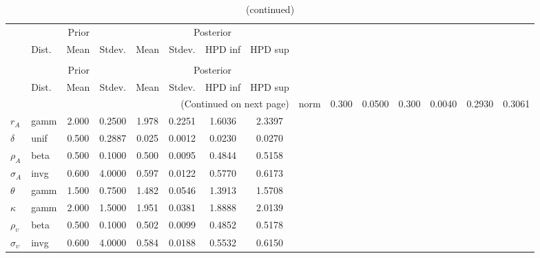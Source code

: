  
\begin{center}
\begin{longtable}{llcccccc} 
\caption{Results from Metropolis-Hastings (parameters)}
 \label{Table:MHPosterior:1}\\
\toprule 
  & \multicolumn{3}{c}{Prior}  &  \multicolumn{4}{c}{Posterior} \\
  \cmidrule(r{.75em}){2-4} \cmidrule(r{.75em}){5-8}
  & Dist. & Mean  & Stdev. & Mean & Stdev. & HPD inf & HPD sup\\
\midrule \endfirsthead 
\caption{(continued)}\\\toprule 
  & \multicolumn{3}{c}{Prior}  &  \multicolumn{4}{c}{Posterior} \\
  \cmidrule(r{.75em}){2-4} \cmidrule(r{.75em}){5-8}
  & Dist. & Mean  & Stdev. & Mean & Stdev. & HPD inf & HPD sup\\
\midrule \endhead 
\bottomrule \multicolumn{8}{r}{(Continued on next page)} \endfoot 
\bottomrule \endlastfoot 
${\alpha}$ & norm &   0.300 & 0.0500 &   0.300& 0.0040 &  0.2930 &  0.3061 \\ 
${r_{A}}$ & gamm &   2.000 & 0.2500 &   1.978& 0.2251 &  1.6036 &  2.3397 \\ 
${\delta}$ & unif &   0.500 & 0.2887 &   0.025& 0.0012 &  0.0230 &  0.0270 \\ 
${\rho_A}$ & beta &   0.500 & 0.1000 &   0.500& 0.0095 &  0.4844 &  0.5158 \\ 
${\sigma_A}$ & invg &   0.600 & 4.0000 &   0.597& 0.0122 &  0.5770 &  0.6173 \\ 
${\theta}$ & gamm &   1.500 & 0.7500 &   1.482& 0.0546 &  1.3913 &  1.5708 \\ 
${\kappa}$ & gamm &   2.000 & 1.5000 &   1.951& 0.0381 &  1.8888 &  2.0139 \\ 
${\rho_\upsilon}$ & beta &   0.500 & 0.1000 &   0.502& 0.0099 &  0.4852 &  0.5178 \\ 
${\sigma_\upsilon}$ & invg &   0.600 & 4.0000 &   0.584& 0.0188 &  0.5532 &  0.6150 \\ 
\end{longtable}
 \end{center}

